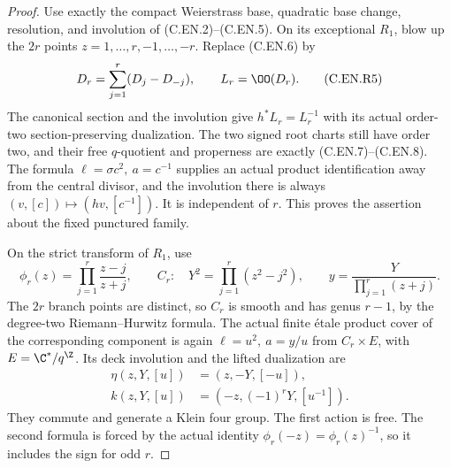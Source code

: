 \begin{proof}
Use exactly the compact Weierstrass base, quadratic
base change, resolution, and involution of
(C.EN.2)--(C.EN.5). On its exceptional $R_1$,
blow up the $2r$ points
$z=1,\ldots,r,-1,\ldots,-r$.
Replace (C.EN.6) by
\[
 D_r=\sum_{j=1}^r(D_j-D_{-j}),\qquad L_r=\OO(D_r).
                                                               \tag{C.EN.R5}
\]
The canonical section and the involution give
$h^*L_r=L_r^{-1}$ with its actual order-two
section-preserving dualization. The two signed
root charts still have order two, and their
free $q$-quotient and properness are exactly
(C.EN.7)--(C.EN.8). The formula
$\ell=\sigma c^2,\ a=c^{-1}$ supplies an
actual product identification away from the
central divisor, and the involution there
is always $(v,[c])\mapsto(hv,[c^{-1}])$.
It is independent of $r$. This proves the
assertion about the fixed punctured family.

On the strict transform of $R_1$, use
\[
 \phi_r(z)=\prod_{j=1}^r\frac{z-j}{z+j},\qquad
 C_r:\quad Y^2=\prod_{j=1}^r(z^2-j^2),\qquad
 y=\frac{Y}{\prod_{j=1}^r(z+j)}.
                                                               \tag{C.EN.R6}
\]
The $2r$ branch points are distinct, so $C_r$
is smooth and has genus $r-1$, by the
degree-two Riemann--Hurwitz formula.
The actual finite \'etale product cover
of the corresponding component is again
$\ell=u^2,\ a=y/u$ from $C_r\times E$,
with $E=\C^*/q^{\Z}$. Its deck involution
and the lifted dualization are
\[
 \begin{split}
 \eta(z,Y,[u])&=(z,-Y,[-u]),\\
 k(z,Y,[u])&=(-z,(-1)^rY,[u^{-1}]).
 \end{split}                                             \tag{C.EN.R7}
\]
They commute and generate a Klein four group.
The first action is free. The second formula
is forced by the actual identity
$\phi_r(-z)=\phi_r(z)^{-1}$, so it includes
the sign for odd $r$.


\end{proof}
